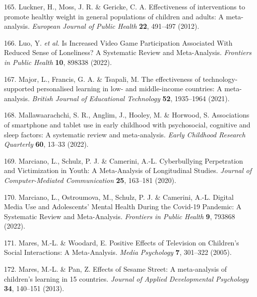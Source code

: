 \documentclass[
  english,
  man]{apa6}
\newenvironment{cslreferences}%
  {}%
  {\par}
\begin{document}
\begin{cslreferences}
\leavevmode\hypertarget{ref-lucknerEffectivenessInterventionsPromote2012}{}%
165. Luckner, H., Moss, J. R. \& Gericke, C. A. Effectiveness of interventions to promote healthy weight in general populations of children and adults: A meta-analysis. \emph{European Journal of Public Health} \textbf{22}, 491--497 (2012).

\leavevmode\hypertarget{ref-luoIncreasedVideoGame2022}{}%
166. Luo, Y. \emph{et al.} Is Increased Video Game Participation Associated With Reduced Sense of Loneliness? A Systematic Review and Meta-Analysis. \emph{Frontiers in Public Health} \textbf{10}, 898338 (2022).

\leavevmode\hypertarget{ref-majorEffectivenessTechnologySupported2021}{}%
167. Major, L., Francis, G. A. \& Tsapali, M. The effectiveness of technology-supported personalised learning in low- and middle-income countries: A meta-analysis. \emph{British Journal of Educational Technology} \textbf{52}, 1935--1964 (2021).

\leavevmode\hypertarget{ref-mallawaarachchiAssociationsSmartphoneTablet2022}{}%
168. Mallawaarachchi, S. R., Anglim, J., Hooley, M. \& Horwood, S. Associations of smartphone and tablet use in early childhood with psychosocial, cognitive and sleep factors: A systematic review and meta-analysis. \emph{Early Childhood Research Quarterly} \textbf{60}, 13--33 (2022).

\leavevmode\hypertarget{ref-marcianoCyberbullyingPerpetrationVictimization2020}{}%
169. Marciano, L., Schulz, P. J. \& Camerini, A.-L. Cyberbullying Perpetration and Victimization in Youth: A Meta-Analysis of Longitudinal Studies. \emph{Journal of Computer-Mediated Communication} \textbf{25}, 163--181 (2020).

\leavevmode\hypertarget{ref-marcianoDigitalMediaUse2021}{}%
170. Marciano, L., Ostroumova, M., Schulz, P. J. \& Camerini, A.-L. Digital Media Use and Adolescents' Mental Health During the Covid-19 Pandemic: A Systematic Review and Meta-Analysis. \emph{Frontiers in Public Health} \textbf{9}, 793868 (2022).

\leavevmode\hypertarget{ref-maresPositiveEffectsTelevision2005}{}%
171. Mares, M.-L. \& Woodard, E. Positive Effects of Television on Children's Social Interactions: A Meta-Analysis. \emph{Media Psychology} \textbf{7}, 301--322 (2005).

\leavevmode\hypertarget{ref-maresEffectsSesameStreet2013}{}%
172. Mares, M.-L. \& Pan, Z. Effects of Sesame Street: A meta-analysis of children's learning in 15 countries. \emph{Journal of Applied Developmental Psychology} \textbf{34}, 140--151 (2013).


\end{cslreferences}
\end{document}
